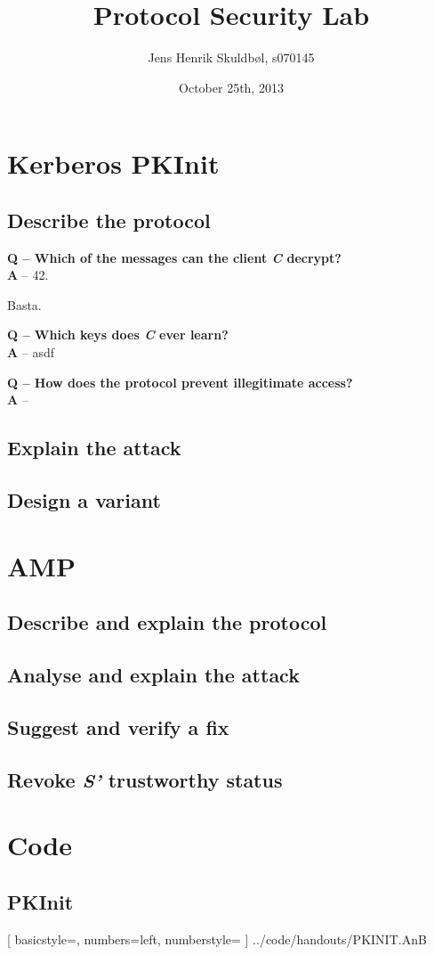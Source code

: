 \documentclass{article}
\title{Protocol Security Lab}
\author{Jens Henrik Skuldbøl, s070145}
\date{October 25th, 2013}
\newcommand\Q[1]{
	\leavevmode\par
	\noindent
	\textbf{Q -- #1}
	\\
}
\newcommand\A[1]{
	\textbf{A} -- #1
}
\begin{document}
\maketitle

\section{Kerberos PKInit}

\subsection{Describe the protocol}
\Q{Which of the messages can the client \emph{C} decrypt?}
\A{42.\par Basta.}

\Q{Which keys does \emph{C} ever learn?}
\A{asdf}

\Q{How does the protocol prevent illegitimate access?}
\A{\lipsum}


\subsection{Explain the attack}

\subsection{Design a variant}

\section{AMP}

\subsection{Describe and explain the protocol}

\subsection{Analyse and explain the attack}

\subsection{Suggest and verify a fix}

\subsection{Revoke \emph{S'} trustworthy status}

\appendix

\section{Code}

\subsection{PKInit}

	[
		basicstyle=\footnotesize,
		numbers=left, 
		numberstyle=\tiny
	]
	{../code/handouts/PKINIT.AnB}
\end{document}
